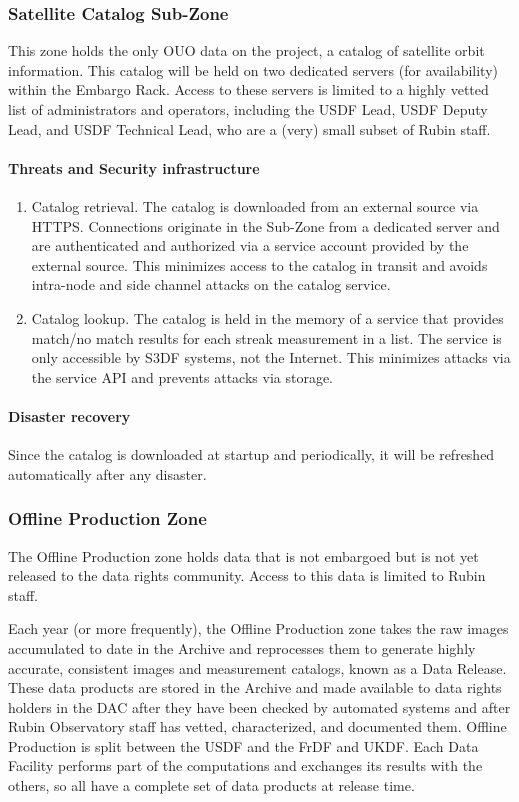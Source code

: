 \subsubsection{Satellite Catalog Sub-Zone} \label{sec:satcat}
This zone holds the only \gls{OUO} data on the project, a catalog of satellite orbit information.
This catalog will be held on two dedicated servers (for availability) within the Embargo Rack.
Access to these servers is limited to a highly vetted list of administrators and operators, including the \gls{USDF} Lead, \gls{USDF} Deputy Lead, and \gls{USDF} Technical Lead, who are a (very) small subset of Rubin staff.

\paragraph{ Threats and Security infrastructure}
\begin{enumerate}
\item Catalog retrieval.  The catalog is downloaded from an external source via HTTPS.  Connections originate in the Sub-Zone from a dedicated server and are authenticated and authorized via a service account provided by the external source.  This minimizes access to the catalog in transit and avoids intra-node and side channel attacks on the catalog service.
\item Catalog lookup.  The catalog is held in the memory of a service that provides match/no match results for each streak measurement in a list.  The service is only accessible by S3DF systems, not the Internet.  This minimizes attacks via the service \gls{API} and prevents attacks via storage.
\end{enumerate}

\paragraph{Disaster recovery}
Since the catalog is downloaded at startup and periodically, it will be refreshed automatically after any disaster.

\subsubsection{ Offline Production Zone}

The Offline Production zone holds data that is not embargoed but is not yet released to the data rights community.
Access to this data is limited to Rubin staff.

Each year (or more frequently), the Offline Production zone takes the raw images accumulated to date in the \gls{Archive} and reprocesses them to generate highly accurate, consistent images and measurement catalogs, known as a Data Release. These data products are stored in the \gls{Archive} and made available to data rights holders in the DAC after they have been checked by automated systems and after Rubin Observatory staff has vetted, characterized, and documented them. Offline Production is split between the USDF and the \gls{FrDF} and UKDF. Each Data Facility performs part of the computations and exchanges its results with the others, so all have a complete set of data products at release time.


